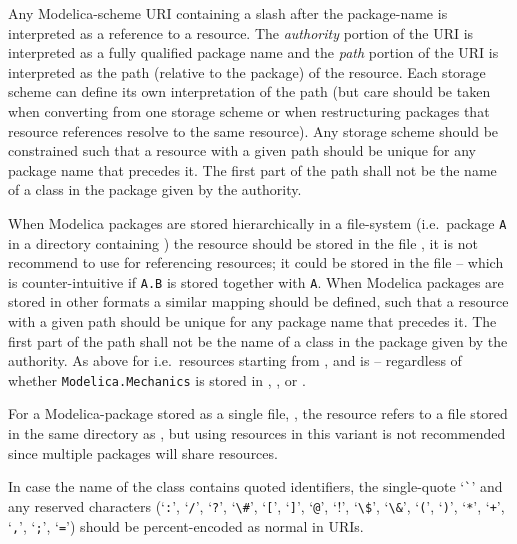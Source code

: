 Any Modelica-scheme URI containing a slash after the package-name is
interpreted as a reference to a resource. The \emph{authority} portion of the
URI is interpreted as a fully qualified package name and the \emph{path}
portion of the URI is interpreted as the path (relative to the package)
of the resource. Each storage scheme can define its own interpretation
of the path (but care should be taken when converting from one storage
scheme or when restructuring packages that resource references resolve
to the same resource). Any storage scheme should be constrained such
that a resource with a given path should be unique for any package name
that precedes it. The first part of the path shall not be the name of a
class in the package given by the authority.

When Modelica packages are stored hierarchically in a file-system (i.e.\ package \lstinline!A! in a directory  containing ) the resource
 should be stored in the file , it is not recommend to use  for referencing
resources; it could be stored in the file  -- which is counter-intuitive if \lstinline!A.B! is stored together with \lstinline!A!.  When Modelica packages
are stored in other formats a similar mapping should be defined, such that a resource with a given path should be unique for any package name that precedes it.  The first
part of the path shall not be the name of a class in the package given by the authority.  As above for  i.e.\ resources starting from
, and  is  -- regardless of whether \lstinline!Modelica.Mechanics!
is stored in , , or .

For a Modelica-package stored as a single file, , the resource
 refers to a file  stored in the same
directory as , but using resources in this variant is not
recommended since multiple packages will share resources.

In case the name of the class contains quoted identifiers, the single-quote `\lstinline!`!'
and any reserved characters (`\lstinline!:!', `\lstinline!/!', `\lstinline!?!', `\lstinline!\#!', `\lstinline![!',
`\lstinline!]!', `\lstinline!@!', `\lstinline!!!', `\lstinline[mathescape=false]!\$!', `\lstinline!\&!', `\lstinline!(!', `\lstinline!)!', `\lstinline!*!', `\lstinline!+!',
`\lstinline!,!', `\lstinline!;!', `\lstinline!=!') should be percent-encoded as normal in URIs.

